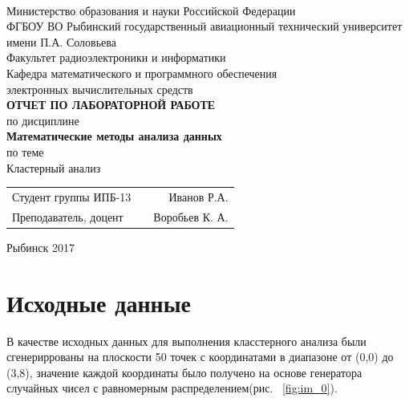 \documentclass[a4paper,12pt]{article}
\begin{document}
\begin{titlepage}
\newpage

\

\begin{center}
	\large		
   	Министерство образования и науки Российской Федерации\\[0.5cm]
    	
	ФГБОУ ВО Рыбинский государственный авиационный технический университет имени П.А. Соловьева\\[1.0cm]

	Факультет радиоэлектроники и информатики\\[0.25cm]
		
	Кафедра математического и программного обеспечения\\ электронных вычислительных средств\\[1.5cm]

	\Large
	\textbf{\textsc{ОТЧЕТ ПО ЛАБОРАТОРНОЙ РАБОТЕ }}\\[0.25cm]
	по  дисциплине\\
	\textbf{Математические методы анализа данных}\\[0.5cm]
	
	по теме\\
	Кластерный анализ

\end{center}

\vfill	
\begin{tabularx}{0.95\textwidth}{lXr}
Студент группы ИПБ-13 			& &	Иванов Р.А.\\
Преподаватель, доцент	& & Воробьев К. А.\\
\end{tabularx}

\vspace{1.5cm}
\center Рыбинск 2017
\end{titlepage}	


\newpage
\setcounter{page}{2}

\tableofcontents

\newpage\section{Исходные данные}
В качестве исходных данных для выполнения класстерного анализа были сгенериррованы на плоскости 50 точек с координатами в диапазоне от (0,0) до (3,8), значение каждой координаты было получено на основе генератора случайных чисел с равномерным распределением(рис. ~\ref{fig:im_0}).
\end{document}
